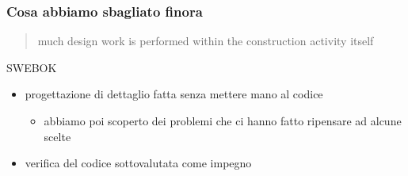 \begin{frame}
\frametitle{Cosa abbiamo sbagliato finora}

\begin{quote}
much design work is performed within the construction activity itself
\end{quote}

\begin{flushright}
SWEBOK
\end{flushright}

\begin{itemize}
\item progettazione di dettaglio fatta senza mettere mano al codice
\begin{itemize}
\item abbiamo poi scoperto dei problemi che ci hanno fatto ripensare ad alcune scelte
\end{itemize}

\item verifica del codice sottovalutata come impegno
\end{itemize}

\end{frame}

